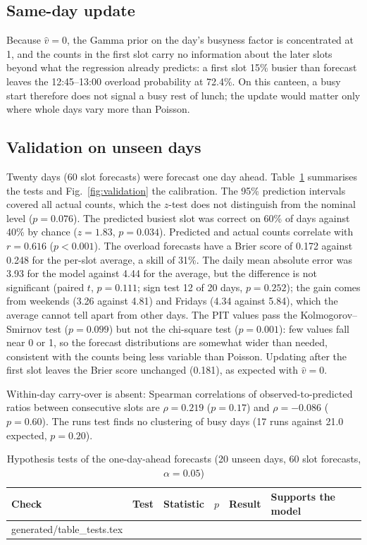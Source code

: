 \documentclass[conference,a4paper]{IEEEtran}
\makeatletter
\newcommand{\tablerows}[1]{\@@input #1 }  %
\makeatother
\begin{document}
\subsection{Same-day update}
Because $\hat v = 0$, the Gamma prior on the day's busyness factor is concentrated at 1, and the counts in the first
slot carry no information about the later slots beyond what the regression already predicts: a first slot 15\% busier
than forecast leaves the 12:45--13:00 overload probability at 72.4\%. On this canteen, a busy start therefore does not
signal a busy rest of lunch; the update would matter only where whole days vary more than Poisson.

\subsection{Validation on unseen days}
Twenty days (60 slot forecasts) were forecast one day ahead. Table~\ref{tab:tests} summarises the tests and
Fig.~\ref{fig:validation} the calibration. The 95\% prediction intervals covered all actual counts, which the $z$-test
does not distinguish from the nominal level ($p = 0.076$). The predicted busiest slot was correct on 60\% of days
against 40\% by chance ($z = 1.83$, $p = 0.034$). Predicted and actual counts correlate with $r = 0.616$
($p < 0.001$). The overload forecasts have a Brier score of 0.172 against 0.248 for the per-slot average, a skill of
31\%. The daily mean absolute error was 3.93 for the model against 4.44 for the average, but the difference is not
significant (paired $t$, $p = 0.111$; sign test 12 of 20 days, $p = 0.252$); the gain comes from weekends (3.26 against
4.81) and Fridays (4.34 against 5.84), which the average cannot tell apart from other days. The PIT values pass the
Kolmogorov--Smirnov test ($p = 0.099$) but not the chi-square test ($p = 0.001$): few values fall near 0 or 1, so the
forecast distributions are somewhat wider than needed, consistent with the counts being less variable than Poisson.
Updating after the first slot leaves the Brier score unchanged (0.181), as expected with $\hat v = 0$.

Within-day carry-over is absent: Spearman correlations of observed-to-predicted ratios between consecutive slots are
$\rho = 0.219$ ($p = 0.17$) and $\rho = -0.086$ ($p = 0.60$). The runs test finds no clustering of busy days (17 runs
against 21.0 expected, $p = 0.20$).

\begin{table}[t]
\caption{Hypothesis tests of the one-day-ahead forecasts (20 unseen days, 60 slot forecasts, $\alpha = 0.05$)}\label{tab:tests}
\centering\footnotesize
\begin{tabular}{@{}llllll@{}}
\toprule
Check & Test & Statistic & $p$ & Result & Supports the model \\
\midrule
\tablerows{generated/table_tests.tex}
\bottomrule
\end{tabular}
\end{table}
\end{document}

